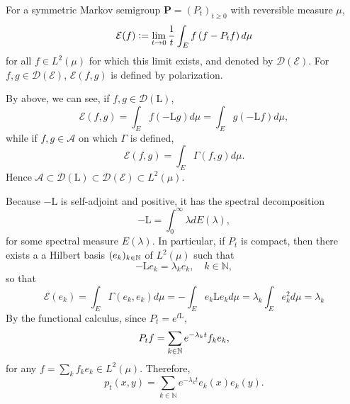 \begin{enumerate}[label=\arabic{*}.]
	\begin{defn}
	    For a symmetric Markov semigroup $\mathbf{P} = (P_t)_{t \geq 0}$ with reversible measure $\mu$, 
	    \begin{equation*}
	        \mathcal{E}(f) \vcentcolon= \lim_{t \rightarrow 0}\frac{1}{t} \int_E f\left(f-P_t f\right) d \mu
	    \end{equation*}
	    for all $f \in L^2(\mu)$ for which this limit exists, and denoted by $\mathcal{D}(\mathcal{E})$. For $f,g \in \mathcal{D}(\mathcal{E})$, $\mathcal{E}(f,g)$ is defined by polarization.
	\end{defn}
	\begin{rmk}
	    By above, we can see, if $f,g \in \mathcal{D}(\mathrm{L})$,
		\begin{equation*}
		    \mathcal{E}(f, g)=\int_E f(-\mathrm{L} g) d \mu=\int_E g(-\mathrm{L} f) d \mu,
		\end{equation*}
		while if $f,g\in \mathcal{A}$ on which $\Gamma$ is defined,
		\begin{equation*}
		    \mathcal{E}(f, g)=\int_E \Gamma(f, g) d \mu.
		\end{equation*}
		Hence $\mathcal{A} \subset \mathcal{D}(\mathrm{L}) \subset \mathcal{D}(\mathcal{E}) \subset L^2(\mu)$.
	\end{rmk}

	Because $-\mathrm{L}$ is self-adjoint and positive, it has the spectral decomposition
	\begin{equation*}
	    -\mathrm{L} = \int_0^\infty \lambda dE(\lambda),
	\end{equation*}
	for some spectral measure $E(\lambda)$. In particular, if $P_t$ is compact, then there exists a a Hilbert basis $(e_k)_{k \in \mathbb{N}}$ of $L^2(\mu)$ such that
	\begin{equation*}
	    -\mathrm{L} e_k=\lambda_k e_k, \quad k \in \mathbb{N},
	\end{equation*}
	so that
	\begin{equation*}
	    \mathcal{E}\left(e_k\right)=\int_E \Gamma\left(e_k, e_k\right) d \mu=-\int_E e_k \mathrm{L} e_k d \mu=\lambda_k \int_E e_k^2 d \mu=\lambda_k
	\end{equation*}
	By the functional calculus, since $P_t = e^{t\mathrm{L}}$,
	\begin{equation*}
	    P_tf = \sum_{k \in \mathbb{N}} e^{-\lambda_k t}f_k e_k,
	\end{equation*}
	for any $f = \sum_k f_k e_k \in L^2(\mu)$. Therefore, 
	\begin{equation*}
	    p_t(x,y) = \sum_{k \in \mathbb{N}} e^{-\lambda_k t} e_k(x) e_k(y).
	\end{equation*}


\end{enumerate}
